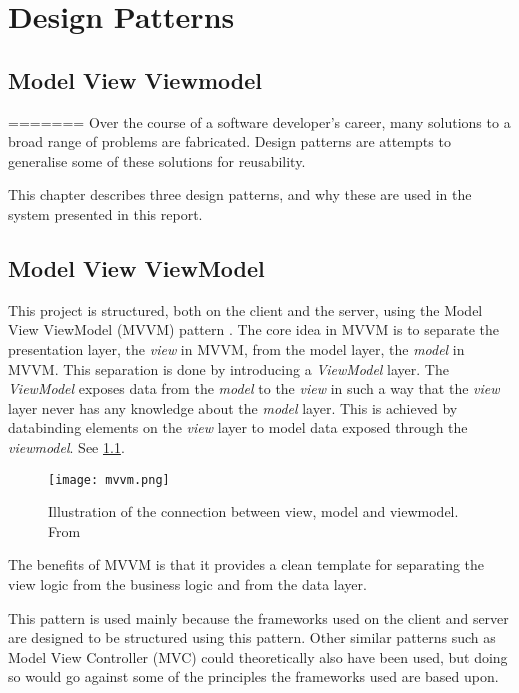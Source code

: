 \chapter{Design Patterns}


\section{Model View Viewmodel}
=======
Over the course of a software developer's career, many solutions to a broad range of
problems are fabricated. Design patterns are attempts to generalise some of these solutions
for reusability.

This chapter describes three design patterns, and why these are used
in the system presented in this report.

\section{Model View ViewModel}

This project is structured, both on the client and the server, using
the Model View ViewModel (MVVM) pattern \cite{mvvm}. The core idea in MVVM is to
separate the presentation layer, the \textit{view} in MVVM, from the model
layer, the \textit{model} in MVVM. This separation is done by introducing a
\textit{ViewModel} layer. The \textit{ViewModel} exposes data from the \textit{model} to the \textit{view}
in such a way that the \textit{view} layer never has any knowledge about the
\textit{model} layer. This is achieved by databinding elements on the \textit{view}
layer to model data exposed through the \textit{viewmodel}. See \cref{fig:mvvm}.

\begin{figure}[hbtp]
  \centering
  \texttt{[image: mvvm.png]}
  \caption{Illustration of the connection between view, model and
    viewmodel. From \cite{mvvm}}\label{fig:mvvm}
\end{figure}

The benefits of MVVM is that it provides a clean template for
separating the view logic from the business logic and from the data
layer.

This pattern is used mainly because the frameworks used on the client
and server are designed to be structured using this pattern. Other
similar patterns such as Model View Controller (MVC) could
theoretically also have been used, but doing so would go against some
of the principles the frameworks used are based upon.

